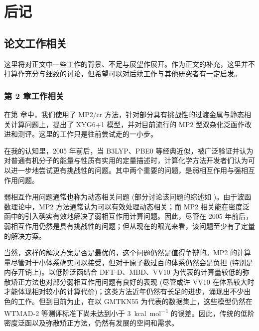 
\chapter{后记}

\section*{论文工作相关}

这里将对正文中一些工作的背景、不足与展望作展开。作为正文的补充，这里并不打算作充分与细致的讨论，但希望可以对后续工作与其他研究者有一定启发。

\subsection*{第 2 章工作相关}

在第  章中，我们使用了 MP2/cr 方法，针对部分具有挑战性的过渡金属与静态相关计算问题上，提出了 XYG6+1 模型，并对目前流行的 MP2 型双杂化泛函作改进和测评。这里的工作只是往前尝试走的一小步。

在我的认知里，2005 年前后，当 B3LYP、PBE0 等经典近似，被广泛验证并认为对普通有机分子的能量与性质有实用的定量描述时\cite{Koch-Holthausen.Wiley.2001}，计算化学方法开发者们认为可以进一步地尝试更有挑战性的问题。其中两个重要的问题，是弱相互作用与强相互作用问题。

弱相互作用问题通常也称为动态相关问题 (部分讨论该问题的综述如 )。由于波函数理论中，MP2 方法通常认为可以有效处理动态相关；而 MP2 相关能在密度泛函中的引入确实有效地解决了弱相互作用计算问题。因此，尽管在 2005 年前后，弱相互作用仍然是具有挑战性的问题；但从现在的眼光来看，该问题至少有了定量的解决方案。

当然，这样的解决方案是否是最优的，这个问题仍然是值得争辩的。MP2 的计算量尽管对于小体系确实可以接受，但对于原子数过百的体系仍然会是负担 (特别是内存开销上)。以低阶泛函结合 DFT-D\cite{Grimme-Krieg.JCP.2010, Smith-Sherrill.JPCL.2016, Caldeweyher-Grimme.JCP.2019}、MBD\cite{Tkatchenko-Scheffler.PRL.2009, Tkatchenko-Scheffler.PRL.2012}、VV10\cite{Vydrov-VanVoorhis.JCP.2010} 为代表的计算量较低的弥散矫正方法也对部分弱相互作用问题有良好的表现 (尽管或许 VV10 在体系较大时才能体现相对较小的计算代价)；这类方法近年仍然有长足的进步，涌现出不少出色的工作\cite{Kirkpatrick-Cohen.S.2021, Liu-He.NCS.2022}。但到目前为止，在以 GMTKN55 为代表的数据集上，这些模型仍然在 WTMAD-2 等测评标准下尚未达到小于 \SI{3}{kcal.mol^{-1}} 的误差。因此，传统的低阶密度泛函以及弥散矫正方法，仍然有发展的空间和需求。


